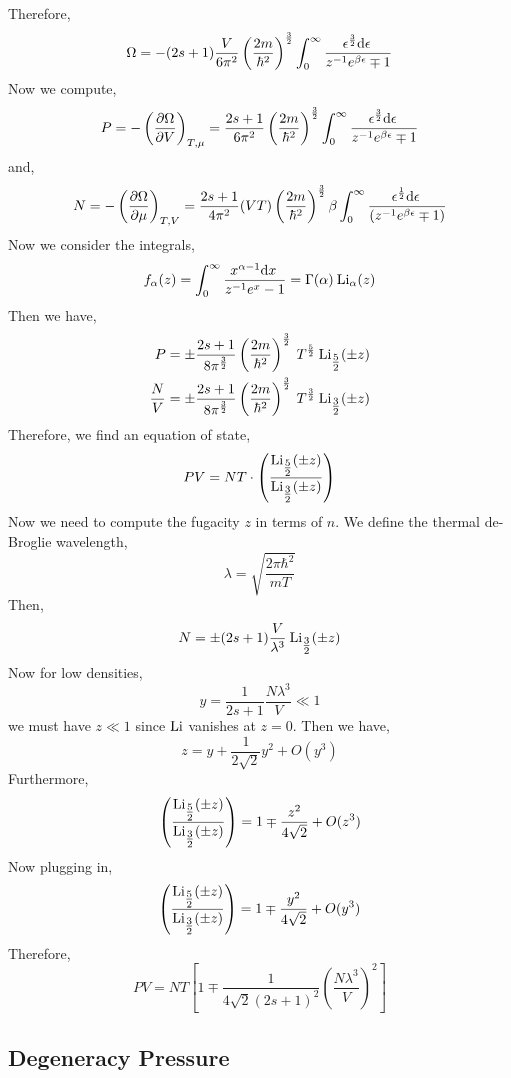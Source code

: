 \documentclass[12pt]{article}
\begin{document}
Therefore,
\[ \Omega = - (2 s + 1) \frac{V}{6 \pi^2} \left( \frac{2 m}{\hbar^2} \right)^{\frac{3}{2}} \int_0^{\infty} \frac{\epsilon^{\frac{3}{2}} \mathrm{d}\epsilon \:}{z^{-1} e^{\beta \epsilon} \mp 1} \]
Now we compute,
\[ P = - \left( \frac{\partial{\Omega}}{\partial{V}} \right)_{T, \mu} =  \frac{2 s + 1}{6 \pi^2} \left( \frac{2 m}{\hbar^2} \right)^{\frac{3}{2}} \int_0^{\infty} \frac{\epsilon^{\frac{3}{2}} \mathrm{d}\epsilon \:}{z^{-1} e^{\beta \epsilon} \mp 1} \]
and,
\[N = - \left( \frac{\partial{\Omega}}{\partial{\mu}} \right)_{T, V} =  \frac{2 s + 1}{4 \pi^2} (VT) \left( \frac{2 m}{\hbar^2} \right)^{\frac{3}{2}} \beta \int_0^{\infty} \frac{\epsilon^{\frac{1}{2}} \mathrm{d}\epsilon \:}{(z^{-1} e^{\beta \epsilon} \mp 1)} \]
Now we consider the integrals,
\[ f_{\alpha}(z) = \int_0^{\infty} \frac{x^{\alpha - 1} \mathrm{d}x \:}{z^{-1} e^x - 1} = \Gamma(\alpha) \: \mathrm{Li}_{\alpha}(z) \]
Then we have,
\begin{align*}
P & = \pm \frac{2 s + 1}{8 \pi^{\frac{3}{2}}} \left( \frac{2 m}{\hbar^2} \right)^{\frac{3}{2}} \: T^{\frac{5}{2}} \: \mathrm{Li}_{\tfrac{5}{2}}(\pm z)
\\
\frac{N}{V} & = \pm \frac{2 s + 1}{8 \pi^{\frac{3}{2}}} \left( \frac{2 m}{\hbar^2} \right)^{\frac{3}{2}} \: T^{\frac{3}{2}} \: \mathrm{Li}_{\tfrac{3}{2}}(\pm z)
\end{align*}
Therefore, we find an equation of state,
\[ PV =  N T \cdot \left( \frac{\mathrm{Li}_{\tfrac{5}{2}}(\pm z)}{\mathrm{Li}_{\tfrac{3}{2}}(\pm z)} \right) \]
Now we need to compute the fugacity $z$ in terms of $n$. 
We define the thermal de-Broglie wavelength,
\[ \lambda = \sqrt{\frac{2 \pi \hbar^2}{m T}}  \] 
Then,
\[ N = \pm (2 s + 1) \frac{V}{\lambda^3} \: \mathrm{Li}_{\tfrac{3}{2}}(\pm z) \]
Now for low densities,
\[ y = \frac{1}{2s + 1} \frac{N \lambda^3}{V} \ll 1 \]
we must have $z \ll 1$ since $\mathrm{Li}$ vanishes at $z = 0$. Then we have, 
\[ z = y + \frac{1}{2 \sqrt{2}} y^2 + O(y^3) \]
Furthermore,
\[ \left( \frac{\mathrm{Li}_{\tfrac{5}{2}}(\pm z)}{\mathrm{Li}_{\tfrac{3}{2}}(\pm z)} \right) = 1 \mp \frac{z^2}{4 \sqrt{2}} + O(z^3) \]  
Now plugging in,
\[ \left( \frac{\mathrm{Li}_{\tfrac{5}{2}}(\pm z)}{\mathrm{Li}_{\tfrac{3}{2}}(\pm z)} \right) = 1 \mp \frac{y^2}{4 \sqrt{2}} + O(y^3) \]
Therefore,
\[ PV = NT \left[ 1 \mp \frac{1}{4 \sqrt{2}(2 s + 1)^2} \left( \frac{N \lambda^3}{V} \right)^2 \right] \]

\subsection{Degeneracy Pressure}
\end{document}
